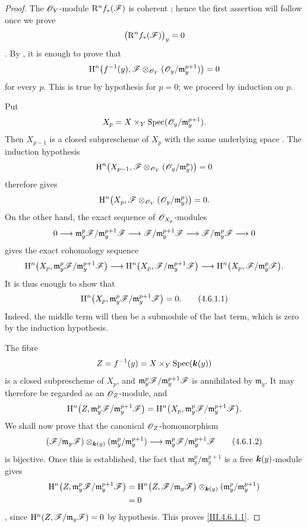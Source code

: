 \begin{proof}
The $\mathscr{O}_Y$-module $\mathrm{R}^n f_*(\mathscr{F})$ is coherent
; hence the first assertion will follow once we prove
\[
  \bigl(\mathrm{R}^n f_*(\mathscr{F})\bigr)_y=0
\]
.  By , it is enough to prove that
\[
  \mathrm{H}^n\bigl(f^{-1}(y),
    \mathscr{F}\otimes_{\mathscr{O}_Y}
      (\mathscr{O}_y/\mathfrak m_y^{p+1})\bigr)=0
\]
for every $p$.  This is true by hypothesis for $p=0$; we proceed by
induction on $p$.

Put
\[
  X_p=X\times_Y
    \operatorname{Spec}(\mathscr{O}_y/\mathfrak m_y^{p+1}).
\]
Then $X_{p-1}$ is a closed subprescheme of $X_p$ with the same
underlying space .  The induction hypothesis
\[
  \mathrm{H}^n\bigl(X_{p-1},
    \mathscr{F}\otimes_{\mathscr{O}_Y}
      (\mathscr{O}_y/\mathfrak m_y^p)\bigr)=0
\]
therefore gives
\[
  \mathrm{H}^n\bigl(X_p,
    \mathscr{F}\otimes_{\mathscr{O}_Y}
      (\mathscr{O}_y/\mathfrak m_y^p)\bigr)=0.
\]
On the other hand, the exact sequence of $\mathscr{O}_{X_p}$-modules
\[
  0\longrightarrow
  \mathfrak m_y^p\mathscr{F}/\mathfrak m_y^{p+1}\mathscr{F}
  \longrightarrow
  \mathscr{F}/\mathfrak m_y^{p+1}\mathscr{F}
  \longrightarrow
  \mathscr{F}/\mathfrak m_y^p\mathscr{F}
  \longrightarrow0
\]
gives the exact cohomology sequence
\[
  \mathrm{H}^n\bigl(X_p,
    \mathfrak m_y^p\mathscr{F}/\mathfrak m_y^{p+1}\mathscr{F}\bigr)
  \longrightarrow
  \mathrm{H}^n\bigl(X_p,\mathscr{F}/\mathfrak m_y^{p+1}\mathscr{F}\bigr)
  \longrightarrow
  \mathrm{H}^n\bigl(X_p,\mathscr{F}/\mathfrak m_y^p\mathscr{F}\bigr).
\]
It is thus enough to show that
\[
\label{III.4.6.1.1}
  \mathrm{H}^n\bigl(X_p,
    \mathfrak m_y^p\mathscr{F}/\mathfrak m_y^{p+1}\mathscr{F}\bigr)=0.
  \tag{4.6.1.1}
\]
Indeed, the middle term will then be a submodule of the last term,
which is zero by the induction hypothesis.


The fibre
\[
  Z=f^{-1}(y)=X\times_Y\operatorname{Spec}(\boldsymbol{k}(y))
\]
is a closed subprescheme of $X_p$, and
$\mathfrak m_y^p\mathscr{F}/\mathfrak m_y^{p+1}\mathscr{F}$ is annihilated by
$\mathfrak m_y$.  It may therefore be regarded as an
$\mathscr{O}_Z$-module, and
\[
  \mathrm{H}^n\bigl(Z,
    \mathfrak m_y^p\mathscr{F}/\mathfrak m_y^{p+1}\mathscr{F}\bigr)
  =
  \mathrm{H}^n\bigl(X_p,
    \mathfrak m_y^p\mathscr{F}/\mathfrak m_y^{p+1}\mathscr{F}\bigr).
\]
We shall now prove that the canonical $\mathscr{O}_Z$-homomorphism
\[
\label{III.4.6.1.2}
  (\mathscr{F}/\mathfrak m_y\mathscr{F})
    \otimes_{\boldsymbol{k}(y)}
      (\mathfrak m_y^p/\mathfrak m_y^{p+1})
  \longrightarrow
  \mathfrak m_y^p\mathscr{F}/\mathfrak m_y^{p+1}\mathscr{F}
  \tag{4.6.1.2}
\]
is bijective.  Once this is established, the fact that
$\mathfrak m_y^p/\mathfrak m_y^{p+1}$ is a free
$\boldsymbol{k}(y)$-module gives
\[
\begin{split}
  \mathrm{H}^n\bigl(Z,
    \mathfrak m_y^p\mathscr{F}/\mathfrak m_y^{p+1}\mathscr{F}\bigr)
  &=
  \mathrm{H}^n\bigl(Z,\mathscr{F}/\mathfrak m_y\mathscr{F}\bigr)
    \otimes_{\boldsymbol{k}(y)}
      (\mathfrak m_y^p/\mathfrak m_y^{p+1})\\
  &=0
\end{split}
\]
, since
$\mathrm{H}^n(Z,\mathscr{F}/\mathfrak m_y\mathscr{F})=0$ by hypothesis.  This proves
\eqref{III.4.6.1.1}.


\end{proof}
